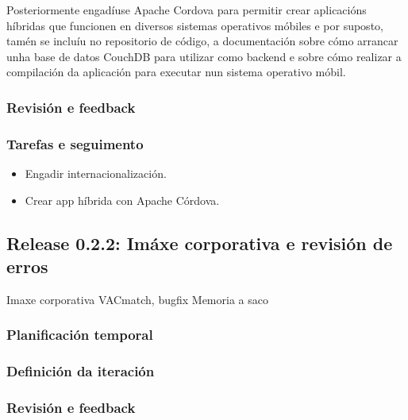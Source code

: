       Posteriormente engadíuse Apache Cordova para permitir crear aplicacións 
híbridas que funcionen en diversos sistemas operativos móbiles e por suposto, 
tamén se incluíu no repositorio de código, a documentación sobre cómo arrancar 
unha base de datos CouchDB para utilizar como backend e sobre cómo realizar a 
compilación da aplicación para executar nun sistema operativo móbil.

      \subsubsection{Revisión e feedback}

      \subsubsection{Tarefas e seguimento}
        \begin{itemize}
        \item Engadir internacionalización.
        \item Crear app híbrida con Apache Córdova.
        \end{itemize}
%
%
    \subsection{Release 0.2.2: Imáxe corporativa e revisión de erros}
    Imaxe corporativa VACmatch, bugfix
    Memoria a saco
      \subsubsection{Planificación temporal}
      \subsubsection{Definición da iteración}
      \subsubsection{Revisión e feedback}
